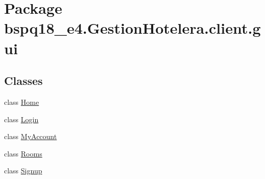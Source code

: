 \hypertarget{namespacebspq18__e4_1_1_gestion_hotelera_1_1client_1_1gui}{}\section{Package bspq18\+\_\+e4.\+Gestion\+Hotelera.\+client.\+gui}
\label{namespacebspq18__e4_1_1_gestion_hotelera_1_1client_1_1gui}
\subsection*{Classes}
\begin{DoxyCompactItemize}
\item 
class \mbox{\hyperlink{classbspq18__e4_1_1_gestion_hotelera_1_1client_1_1gui_1_1_home}{Home}}
\item 
class \mbox{\hyperlink{classbspq18__e4_1_1_gestion_hotelera_1_1client_1_1gui_1_1_login}{Login}}
\item 
class \mbox{\hyperlink{classbspq18__e4_1_1_gestion_hotelera_1_1client_1_1gui_1_1_my_account}{My\+Account}}
\item 
class \mbox{\hyperlink{classbspq18__e4_1_1_gestion_hotelera_1_1client_1_1gui_1_1_rooms}{Rooms}}
\item 
class \mbox{\hyperlink{classbspq18__e4_1_1_gestion_hotelera_1_1client_1_1gui_1_1_signup}{Signup}}
\end{DoxyCompactItemize}
